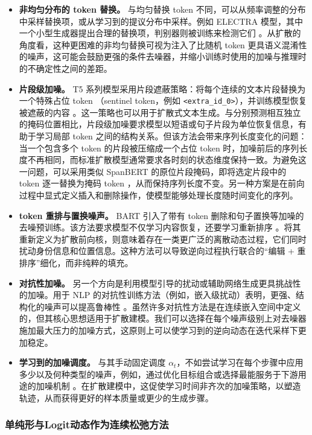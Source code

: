 \documentclass[UTF8,a4paper,zihao=-4,oneside,openany]{ctexbook}
\begin{document}
\begin{itemize}
\item \textbf{非均匀分布的 token 替换。}
与均匀替换 token 不同，可以从频率调整的分布中采样替换项，或从学习到的提议分布中采样。例如 ELECTRA 模型，其中一个小型生成器提出合理的替换项，判别器则被训练来检测它们 \citep{clark-etal:2019electra}。从扩散的角度看，这种更困难的非均匀替换可视为注入了比随机 token 更具语义混淆性的噪声，这可能会鼓励更强的条件去噪器，并缩小训练时使用的加噪与推理时的不确定性之间的差距。
\item \textbf{片段级加噪。}
T5 系列模型采用片段遮蔽策略：将每个连续的文本片段替换为一个特殊占位 token （sentinel token，例如 \texttt{<extra\_id\_0>}），并训练模型恢复被遮蔽的内容
\citep{raffel-etal:2020exploring}。这一策略也可以用于扩散式文本生成。与分别预测相互独立的掩码位置相比，片段级加噪要求模型以短语或句子片段为单位恢复信息，有助于学习局部 token 之间的结构关系。但该方法会带来序列长度变化的问题：当一个包含多个 token 的片段被压缩成一个占位 token 时，加噪前后的序列长度不再相同，而标准扩散模型通常要求各时刻的状态维度保持一致。为避免这一问题，可以采用类似 SpanBERT 的原位片段掩码\citep{joshi-etal:2020spanbert}，即将选定片段中的 token 逐一替换为掩码 token ，从而保持序列长度不变。另一种方案是在前向过程中显式定义插入和删除操作，使模型能够处理长度随时间变化的序列\citep{gu-etal:2019levenshtein,reid-etal:2022diffuser}。
\item \textbf{ token 重排与置换噪声。}
BART 引入了带有 token 删除和句子置换等加噪的去噪预训练。该方法要求模型不仅学习内容恢复，还要学习重新排序 \citep{lewis-etal:2020bart}。将其重新定义为扩散前向核，则意味着存在一类更广泛的离散动态过程，它们同时扰动身份信息和位置信息。这种方法可以导致逆向过程执行联合的“编辑 + 重排序”细化，而非纯粹的填充。
\item \textbf{对抗性加噪。}
另一个方向是利用模型引导的扰动或辅助网络生成更具挑战性的加噪。用于 NLP 的对抗性训练方法（例如，嵌入级扰动）表明，更强、结构化的噪声可以提高鲁棒性 \citep{zhu-etal:2020freelb}。虽然许多对抗性方法是在连续嵌入空间中定义的，但其核心思想适用于扩散建模。我们可以选择在每个噪声级别上对去噪器施加最大压力的加噪方式，这原则上可以使学习到的逆向动态在迭代采样下更加稳定。
\item \textbf{学习到的加噪调度。}
与其手动固定调度 $\alpha_t$，不如尝试学习在每个步骤中应用多少以及何种类型的噪声，例如，通过优化目标组合或选择最能服务于下游用途的加噪机制 \citep{tay-etal:2023ul2}。在扩散建模中，这促使学习时间非齐次的加噪策略，以塑造轨迹，从而获得更好的样本质量或更少的生成步骤。
\end{itemize}
\subsubsection{单纯形与Logit动态作为连续松弛方法}
\end{document}

